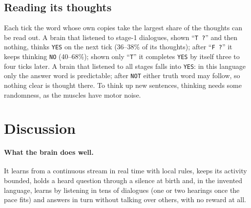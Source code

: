 \documentclass[11pt]{article}
\begin{document}
\subsection{Reading its thoughts}
Each tick the word whose own copies take the largest share of the thoughts can be read out. A brain that listened to
stage-1 dialogues, shown ``\texttt{T ?}'' and then nothing, thinks \texttt{YES} on the next tick (36--38\% of its
thoughts); after ``\texttt{F ?}'' it keeps thinking \texttt{NO} (40--68\%); shown only ``\texttt{T}'' it completes
\texttt{YES} by itself three to four ticks later. A brain that listened to all stages falls into \texttt{YES}: in this
language only the answer word is predictable; after \texttt{NOT} either truth word may follow, so nothing clear is
thought there. To think up new sentences, thinking needs some randomness, as the muscles have motor noise.

\section{Discussion}

\paragraph{What the brain does well.} It learns from a continuous stream in real time with local rules, keeps its
activity bounded, holds a heard question through a silence at birth and, in the invented language, learns by listening in
tens of dialogues (one or two hearings once the pace fits) and answers in turn without talking over others, with no reward
at all.
\end{document}
